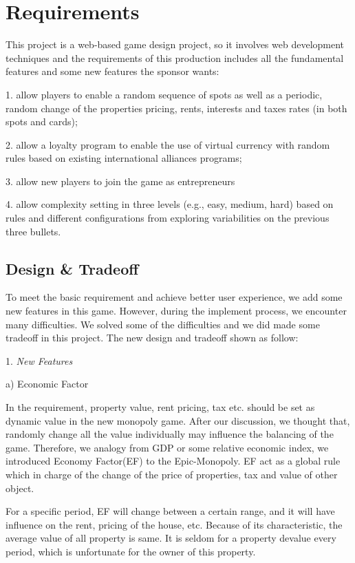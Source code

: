 \documentclass[a4paper,11pt]{article}
\begin{document}
\section{Requirements}
This project is a web-based game design project, so it involves web development techniques and the requirements of this production includes all the fundamental features and some new features the sponsor wants:

1.	allow players to enable a random sequence of spots as well as a periodic, random change of the properties pricing, rents, interests and taxes rates (in both spots and cards);

2.	allow a loyalty program to enable the use of virtual currency with random rules based on existing international alliances programs;

3.	allow new players to join the game as entrepreneurs

4.	allow complexity setting in three levels (e.g., easy, medium, hard) based on rules and different configurations from exploring variabilities on the previous three bullets.

\subsection{Design \& Tradeoff}
To meet the basic requirement and achieve better user experience, we add some new features in this game. However, during the implement process, we encounter many difficulties. We solved some of the difficulties and we did made some tradeoff in this project. The new design and tradeoff shown as follow:

1.	\emph{New Features}

a)	Economic Factor

In the requirement, property value, rent pricing, tax etc. should be set as dynamic value in the new monopoly game. After our discussion, we thought that, randomly change all the value individually may influence the balancing of the game. Therefore, we analogy from GDP or some relative economic index, we introduced Economy Factor(EF) to the Epic-Monopoly. EF act as a global rule which in charge of the change of the price of properties, tax and value of other object. 

For a specific period, EF will change between a certain range, and it will have influence on the rent, pricing of the house, etc. Because of its characteristic, the average value of all property is same. It is seldom for a property devalue every period, which is unfortunate for the owner of this property.
\end{document}
